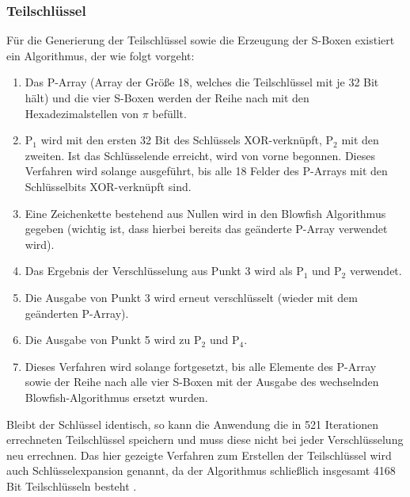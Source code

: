 \documentclass[10pt, a4paper,headsepline,pointednumbers]{scrreprt}
\begin{document}
\subsubsection{Teilschlüssel}
Für die Generierung der Teilschlüssel sowie die Erzeugung der S-Boxen existiert ein Algorithmus, der wie folgt vorgeht:
\begin{enumerate}
\item Das P-Array (Array der Größe 18, welches die Teilschlüssel mit je 32 Bit hält) und die vier S-Boxen werden der Reihe nach mit den Hexadezimalstellen von $\pi$ befüllt.
\item P$_{1}$ wird mit den ersten 32 Bit des Schlüssels XOR-verknüpft, P$_{2}$ mit den zweiten. Ist das Schlüsselende erreicht, wird von vorne begonnen. Dieses Verfahren wird solange ausgeführt, bis alle 18 Felder des P-Arrays mit den Schlüsselbits XOR-verknüpft sind.
\item Eine Zeichenkette bestehend aus Nullen wird in den Blowfish Algorithmus gegeben (wichtig ist, dass hierbei bereits das geänderte P-Array verwendet wird).
\item Das Ergebnis der Verschlüsselung aus Punkt 3 wird als P$_{1}$ und P$_{2}$ verwendet.
\item Die Ausgabe von Punkt 3 wird erneut verschlüsselt (wieder mit dem geänderten P-Array).
\item Die Ausgabe von Punkt 5 wird zu P$_{2}$ und P$_{4}$.
\item Dieses Verfahren wird solange fortgesetzt, bis alle Elemente des P-Array sowie der Reihe nach alle vier S-Boxen mit der Ausgabe des wechselnden Blowfish-Algorithmus ersetzt wurden.
\end{enumerate}
Bleibt der Schlüssel identisch, so kann die Anwendung die in 521 Iterationen errechneten Teilschlüssel speichern und muss diese nicht bei jeder Verschlüsselung neu errechnen.
Das hier gezeigte Verfahren zum Erstellen der Teilschlüssel wird auch Schlüsselexpansion genannt, da der Algorithmus schließlich insgesamt 4168 Bit Teilschlüsseln besteht \citep[S. 390f]{book:angewandte-krypto}.
 
\end{document}
